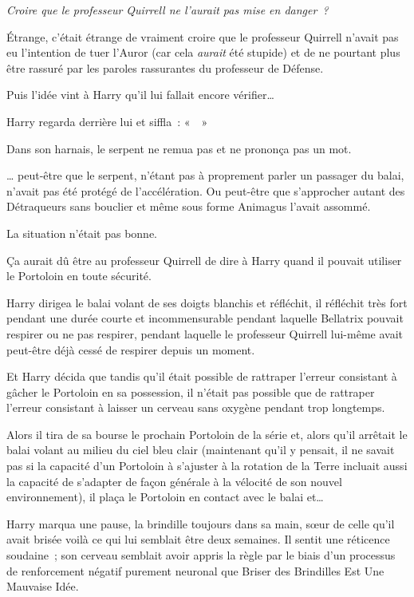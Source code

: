 \emph{Croire que le professeur Quirrell ne l'aurait pas mise en danger~?}

Étrange, c'était étrange de vraiment croire que le professeur Quirrell n'avait pas eu l'intention de tuer l'Auror (car cela \emph{aurait} été stupide) et de ne pourtant plus être rassuré par les paroles rassurantes du professeur de Défense.

Puis l'idée vint à Harry qu'il lui fallait encore vérifier…

Harry regarda derrière lui et siffla~: «~~»

Dans son harnais, le serpent ne remua pas et ne prononça pas un mot.

… peut-être que le serpent, n'étant pas à proprement parler un passager du balai, n'avait pas été protégé de l'accélération. Ou peut-être que s'approcher autant des Détraqueurs sans bouclier et même sous forme Animagus l'avait assommé.

La situation n'était pas bonne.

Ça aurait dû être au professeur Quirrell de dire à Harry quand il pouvait utiliser le Portoloin en toute sécurité.

Harry dirigea le balai volant de ses doigts blanchis et réfléchit, il réfléchit très fort pendant une durée courte et incommensurable pendant laquelle Bellatrix pouvait respirer ou ne pas respirer, pendant laquelle le professeur Quirrell lui-même avait peut-être déjà cessé de respirer depuis un moment.

Et Harry décida que tandis qu'il était possible de rattraper l'erreur consistant à gâcher le Portoloin en sa possession, il n'était pas possible que de rattraper l'erreur consistant à laisser un cerveau sans oxygène pendant trop longtemps.

Alors il tira de sa bourse le prochain Portoloin de la série et, alors qu'il arrêtait le balai volant au milieu du ciel bleu clair (maintenant qu'il y pensait, il ne savait pas si la capacité d'un Portoloin à s'ajuster à la rotation de la Terre incluait aussi la capacité de s'adapter de façon générale à la vélocité de son nouvel environnement), il plaça le Portoloin en contact avec le balai et…

Harry marqua une pause, la brindille toujours dans sa main, sœur de celle qu'il avait brisée voilà ce qui lui semblait être deux semaines. Il sentit une réticence soudaine~; son cerveau semblait avoir appris la règle par le biais d'un processus de renforcement négatif purement neuronal que Briser des Brindilles Est Une Mauvaise Idée.

